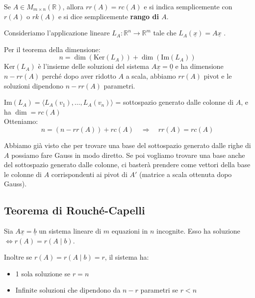 \documentclass[
  a4paper,
]{article}
\providecommand{\tightlist}{%
  \setlength{\itemsep}{0pt}\setlength{\parskip}{0pt}}
\providecommand{\tightlist}{}
\begin{document}
\begin{propositionbox}
Se \(A \in M_{m \times n}(\mathbb{R})\), allora \(rr(A) = rc(A)\) e si
indica semplicemente con \(r(A)\) o \(rk(A)\) e si dice semplicemente
\textbf{rango di \(A\)}.
\end{propositionbox}

\begin{proofbox}
Consideriamo l'applicazione lineare
\(L_A : \mathbb{R}^n \to \mathbb{R}^m\) tale che
\(L_A (\underline{x}) = A\underline{x}\) .

Per il teorema della dimensione: \[
n = \dim(\text{Ker} (L_A)) + \dim(\text{Im} (L_A))
\] \(\text{Ker}(L_A)\) è l'insieme delle soluzioni del sistema
\(A\underline{x} = \underline{0}\) e ha dimensione \(n - rr(A)\) perché
dopo aver ridotto \(A\) a scala, abbiamo \(rr(A)\) pivot e le soluzioni
dipendono \(n - rr(A)\) parametri.

\(\text{Im}(L_A) = \langle L_A(v_1), \dots , L_A(v_n) \rangle\) =
sottospazio generato dalle colonne di \(A\), e ha \(\dim = rc(A)\)\\
Otteniamo: \[
n = (n -rr(A)) + rc(A) \quad \Rightarrow \quad rr(A) = rc(A)
\]
\end{proofbox}

\begin{observationbox}[Intuizione]
Abbiamo già visto che per trovare una base del sottospazio generato
dalle righe di \(A\) possiamo fare Gauss in modo diretto. Se poi
vogliamo trovare una base anche del sottospazio generato dalle colonne,
ci basterà prendere come vettori della base le colonne di \(A\)
corrispondenti ai pivot di \(A'\) (matrice a scala ottenuta dopo Gauss).
\end{observationbox}

\hypertarget{teorema-di-rouchuxe9-capelli}{%
\subsection{Teorema di
Rouché-Capelli}\label{teorema-di-rouchuxe9-capelli}}

\begin{teoremabox}
Sia \(A\underline{x} = \underline{b}\) un sistema lineare di \(m\)
equazioni in \(n\) incognite. Esso ha soluzione
\(\iff r(A) = r(A \mid b)\).

Inoltre se \(r(A) = r(A \mid b) = r\), il sistema ha:

\begin{itemize}
\tightlist
\item
  1 sola soluzione se \(r=n\)
\item
  Infinite soluzioni che dipendono da \(n-r\) parametri se \(r < n\)
\end{itemize}
\end{teoremabox}
\end{document}
